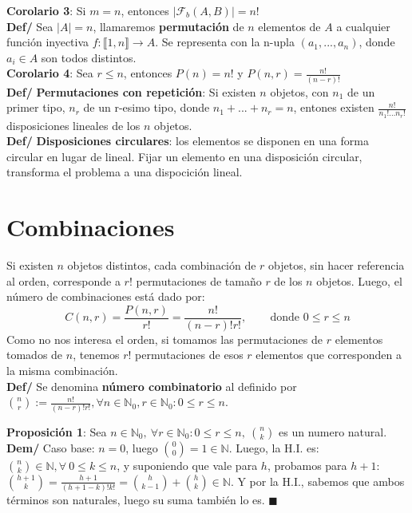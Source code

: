 \documentclass[11pt,a4paper]{article}
\newcommand*{\QEDA}{\null\nobreak\hfill\ensuremath{\blacksquare}}
\begin{document}
\textbf{Corolario 3}: Si $m=n$, entonces $|\mathcal{F}_b(A,B)| = n!$ \\

\textbf{Def/} Sea $|A| = n$, llamaremos \textbf{permutaci\'on} de $n$ elementos de $A$ a cualquier funci\'on inyectiva $f : \llbracket 1,n \rrbracket \rightarrow A$. Se representa con la n-upla $(a_1,...,a_n)$, donde $a_i \in A$ son todos distintos.\\

\textbf{Corolario 4}: Sea $r \leq n$, entonces $P(n) = n!$ y $P(n,r) = \frac{n!}{(n-r)!}$\\

\textbf{Def/} \textbf{Permutaciones con repetici\'on}: Si existen $n$ objetos, con $n_1$ de un primer tipo, $n_r$ de un r-esimo tipo, donde $n_1+...+n_r = n$, entones existen $\frac{n!}{n_1!...n_r!}$ disposiciones lineales de los $n$ objetos.\\

\textbf{Def/} \textbf{Disposiciones circulares}: los elementos se disponen en una forma circular en lugar de lineal. Fijar un elemento en una disposici\'on circular, transforma el problema a una dispocici\'on lineal. 

\section{Combinaciones}
Si existen $n$ objetos distintos, cada combinación de $r$ objetos, sin hacer referencia al orden, corresponde a $r!$ permutaciones de tamaño $r$ de los $n$ objetos. Luego, el número de combinaciones está dado por:
$$C(n,r) = \dfrac{P(n,r)}{r!} = \dfrac{n!}{(n-r)!r!}, \ \ \ \ \ \ \ \ \text{ donde } 0 \leq r \leq n$$
Como no nos interesa el orden, si tomamos las permutaciones de $r$ elementos tomados de $n$, tenemos $r!$ permutaciones de esos $r$ elementos que corresponden a la misma combinaci\'on.\\

\textbf{Def/} Se denomina \textbf{n\'umero combinatorio} al definido por ${n \choose r} := \frac{n!}{(n-r)!r!}, \forall n \in \mathbb{N}_0, r \in \mathbb{N}_0 : 0 \leq r \leq n$.\\

\newpage

\textbf{Proposici\'on 1}: Sea $n \in \mathbb{N}_0,\ \forall r \in \mathbb{N}_0 : 0 \leq r \leq n,\ {n \choose k}$ es un numero natural. \\
\textbf{Dem/} Caso base: $n=0$, luego ${0 \choose 0} = 1 \in \mathbb{N}$. Luego, la H.I. es: ${n \choose k} \in \mathbb{N}, \forall\ 0 \leq k \leq n$, y suponiendo que vale para $h$, probamos para $h+1$: ${h+1 \choose k} = \frac{h+1}{(h+1-k)!k!} = {h \choose k-1} + {h \choose k} \in \mathbb{N}$. Y por la H.I., sabemos que ambos t\'erminos son naturales, luego su suma tambi\'en lo es. \QEDA\\
\end{document}
